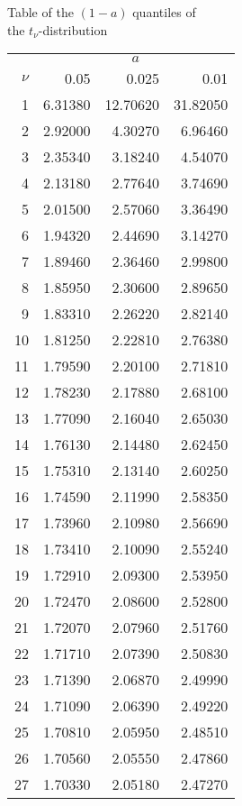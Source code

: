 \documentclass{article}
\begin{document}
	\begin{minipage}[t]{6cm}
		Table of the $(1-a)$ quantiles of\\ the $t_{\nu }$-distribution
		
		\begin{center}
			\begin{tabular}{|r|rrr|}
				\hline
				& \multicolumn{3}{|c|}{$a$} \\ 
				$\nu$ & 0.05 & 0.025 & 0.01 \\ \hline
				1 & 6.31380 & 12.70620 & 31.82050 \\
				2 & 2.92000 & 4.30270 & 6.96460 \\
				3 & 2.35340 & 3.18240 & 4.54070 \\
				4 & 2.13180 & 2.77640 & 3.74690 \\
				5 & 2.01500 & 2.57060 & 3.36490 \\
				6 & 1.94320 & 2.44690 & 3.14270 \\
				7 & 1.89460 & 2.36460 & 2.99800 \\
				8 & 1.85950 & 2.30600 & 2.89650 \\
				9 & 1.83310 & 2.26220 & 2.82140 \\
				10 & 1.81250 & 2.22810 & 2.76380 \\
				11 & 1.79590 & 2.20100 & 2.71810 \\
				12 & 1.78230 & 2.17880 & 2.68100 \\
				13 & 1.77090 & 2.16040 & 2.65030 \\
				14 & 1.76130 & 2.14480 & 2.62450 \\
				15 & 1.75310 & 2.13140 & 2.60250 \\
				16 & 1.74590 & 2.11990 & 2.58350 \\
				17 & 1.73960 & 2.10980 & 2.56690 \\
				18 & 1.73410 & 2.10090 & 2.55240 \\
				19 & 1.72910 & 2.09300 & 2.53950 \\
				20 & 1.72470 & 2.08600 & 2.52800 \\
				21 & 1.72070 & 2.07960 & 2.51760 \\
				22 & 1.71710 & 2.07390 & 2.50830 \\
				23 & 1.71390 & 2.06870 & 2.49990 \\
				24 & 1.71090 & 2.06390 & 2.49220 \\
				25 & 1.70810 & 2.05950 & 2.48510 \\
				26 & 1.70560 & 2.05550 & 2.47860 \\
				27 & 1.70330 & 2.05180 & 2.47270 \\

\end{tabular}
\end{center}
\end{minipage}
\end{document}

